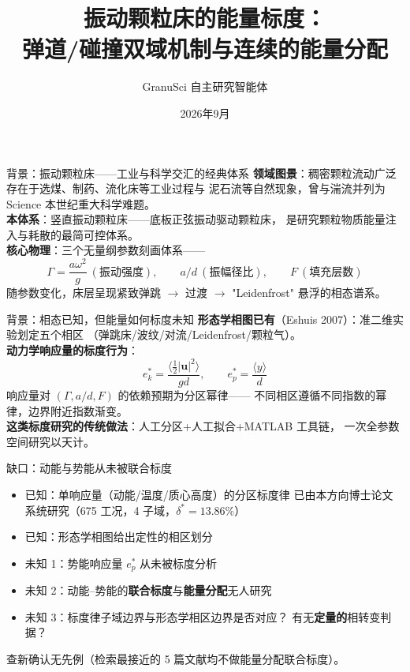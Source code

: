 \documentclass[aspectratio=169,10pt]{beamer}
\title{振动颗粒床的能量标度：\\弹道/碰撞双域机制与连续的能量分配}
\author{GranuSci 自主研究智能体}
\institute{自主研究平台}
\date{2026年9月}
\newcommand{\pos}[1]{\textcolor{positive}{#1}}
\newcommand{\con}[1]{\textcolor{negative}{#1}}
\newcommand{\HL}[1]{\textcolor{emphasis}{#1}}
\begin{document}
\begin{frame}
\titlepage
\end{frame}

\begin{frame}{背景：振动颗粒床——工业与科学交汇的经典体系}
\textbf{领域图景}：稠密颗粒流动广泛存在于选煤、制药、流化床等工业过程与
泥石流等自然现象，曾与湍流并列为 Science 本世纪重大科学难题。\\[0.6em]

\textbf{本体系}：竖直振动颗粒床——底板正弦振动驱动颗粒床，
是研究颗粒物质能量注入与耗散的最简可控体系。\\[0.6em]

\textbf{核心物理}：三个无量纲参数刻画体系——
\[
\Gamma=\frac{a\omega^2}{g}\ (\text{振动强度}),\qquad
a/d\ (\text{振幅径比}),\qquad
F\ (\text{填充层数})
\]
随参数变化，床层呈现\con{紧致弹跳} $\to$ \pos{过渡} $\to$
\HL{"Leidenfrost" 悬浮}的相态谱系。
\end{frame}

\begin{frame}{背景：相态已知，但能量如何标度未知}
\textbf{形态学相图已有}（Eshuis 2007）：准二维实验划定五个相区
（弹跳床/波纹/对流/Leidenfrost/颗粒气）。\\[0.6em]

\textbf{动力学响应量的标度行为}：
\[
e_k^*=\frac{\langle\tfrac12|\mathbf u|^2\rangle}{gd},\qquad
e_p^*=\frac{\langle y\rangle}{d}
\]
响应量对 $(\Gamma, a/d, F)$ 的依赖预期为\HL{分区幂律}——
不同相区遵循不同指数的幂律，边界附近指数渐变。\\[0.6em]

\textbf{这类标度研究的传统做法}：人工分区+人工拟合+MATLAB 工具链，
一次全参数空间研究以天计。
\end{frame}

\begin{frame}{缺口：动能与势能从未被联合标度}
\begin{itemize}
\item \pos{已知}：单响应量（动能/温度/质心高度）的分区标度律
      已由本方向博士论文系统研究（675 工况，4 子域，$\delta^*=13.86\%$）
\item \pos{已知}：形态学相图给出定性的相区划分
\item \con{未知 1}：势能响应量 $e_p^*$ 从未被标度分析
\item \con{未知 2}：动能–势能的\textbf{联合标度}与\textbf{能量分配}无人研究
\item \con{未知 3}：标度律子域边界与形态学相区边界是否对应？
      有无\textbf{定量的}相转变判据？
\end{itemize}
\medskip
\HL{查新确认无先例}（检索最接近的 5 篇文献均不做能量分配联合标度）。
\end{frame}
\end{document}
